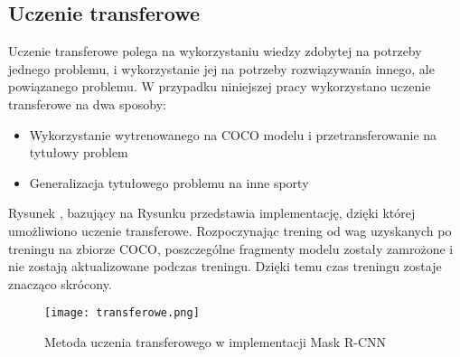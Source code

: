 \subsection{Uczenie transferowe}
\label{sec:uczenie-transferowe}

Uczenie transferowe polega na wykorzystaniu wiedzy zdobytej na potrzeby jednego problemu, i wykorzystanie jej na potrzeby rozwiązywania innego, ale powiązanego problemu.
W przypadku niniejszej pracy wykorzystano uczenie transferowe na dwa sposoby:

\begin{itemize}
	\item Wykorzystanie wytrenowanego na COCO modelu i przetransferowanie na tytułowy problem
	\item Generalizacja tytułowego problemu na inne sporty
\end{itemize}

Rysunek , bazujący na Rysunku  przedstawia implementację, dzięki której umożliwiono uczenie transferowe. Rozpoczynając trening od wag uzyskanych po treningu na zbiorze COCO, poszczególne fragmenty modelu zostały zamrożone i nie zostają aktualizowane podczas treningu. Dzięki temu czas treningu zostaje znacząco skrócony.

\begin{figure}[h]
  \centering
  \caption{Metoda uczenia transferowego w implementacji Mask R-CNN}
  \texttt{[image: transferowe.png]}
  \label{fig:transferowe}
\end{figure}
